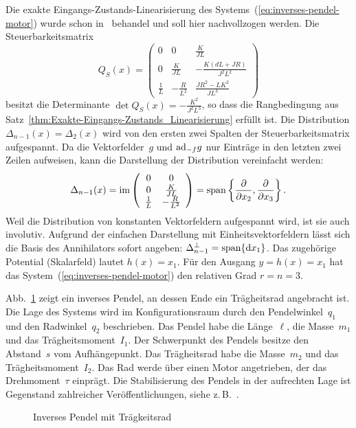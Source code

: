 \begin{example}
Die exakte Eingangs-Zustands-Linearisierung des Systems~(\ref{eq:inverses-pendel-motor})
wurde schon in~\cite{zak86} behandel und soll hier nachvollzogen
werden. Die Steuerbarkeitsmatrix 
\begin{equation}
Q_{S}(x)=\left(\begin{array}{ccc}
0 & 0 & \frac{K}{JL}\\
0 & \frac{K}{JL} & -\frac{K(dL+JR)}{J^{2}L^{2}}\\
\frac{1}{L} & -\frac{R}{L^{2}} & \frac{JR^{2}-LK^{2}}{JL^{3}}
\end{array}\right)\label{eq:inverses-pendel-motor-steuerbarkeitsmatrix}
\end{equation}
besitzt die Determinante $\det Q_{S}(x)=-\tfrac{K^{2}}{J^{2}L^{3}}$,
so dass die Rangbedingung aus Satz~\ref{thm:Exakte-Eingangs-Zustands_Linearisierung}
erfüllt ist. Die Distribution $\Delta_{n-1}(x)=\Delta_{2}(x)$ wird
von den ersten zwei Spalten der Steuerbarkeitsmatrix aufgespannt.
Da die Vektorfelder~$g$ und ${\operatorname{ad}}_{-f}g$ nur Einträge in den letzten
zwei Zeilen aufweisen, kann die Darstellung der Distribution vereinfacht
werden: 
\[
\Delta_{n-1}(x)={\operatorname{im}}\left(\begin{array}{cc}
0 & 0\\
0 & \frac{K}{JL}\\
\frac{1}{L} & -\frac{R}{L^{2}}
\end{array}\right)={\operatorname{span}}\left\{ \frac{\partial}{\partial x_{2}},\frac{\partial}{\partial x_{3}}\right\} .
\]
Weil die Distribution von konstanten Vektorfeldern aufgespannt wird,
ist sie auch involutiv. Aufgrund der einfachen Darstellung mit Einheitsvektorfeldern
lässt sich die Basis des Annihilators sofort angeben: $\Delta_{n-1}^{\perp}={\operatorname{span}}\{{\mathrm{d}} x_{1}\}$.
Das zugehörige Potential (Skalarfeld) lautet $h(x)=x_{1}$. Für den
Ausgang $y=h(x)=x_{1}$ hat das System~(\ref{eq:inverses-pendel-motor})
den relativen Grad $r=n=3$.
\end{example}

\begin{example}
\label{exa:Inverses-Pendel-mit-Traegheitsrad-EZ-distr}Abb.~\ref{fig:Inverses-Pendel-mit-Traegheitsrad}
zeigt ein inverses Pendel, an dessen Ende ein Trägheitsrad angebracht
ist. Die Lage des Systems wird im Konfigurationsraum durch den Pendelwinkel~$q_{1}$
und den Radwinkel~$q_{2}$ beschrieben. Das Pendel habe die Länge~$\ell$,
die Masse~$m_{1}$ und das Trägheitsmoment~$I_{1}$. Der Schwerpunkt
des Pendels besitze den Abstand~$s$ vom Aufhängepunkt. Das Trägheitsrad
habe die Masse~$m_{2}$ und das Trägheitsmoment~$I_{2}$. Das Rad
werde über einen Motor angetrieben, der das Drehmoment~$\tau$ einprägt.
Die Stabilisierung des Pendels in der aufrechten Lage ist Gegenstand
zahlreicher Veröffentlichungen, siehe z.\,B.~\cite{spong2001,olfati2001global}.
\end{example}
\begin{figure}
\begin{centering}
\resizebox{0.45\textwidth}{!}{}
\par\end{centering}
\caption{Inverses Pendel mit Trägkeitsrad\label{fig:Inverses-Pendel-mit-Traegheitsrad}}
\end{figure}

